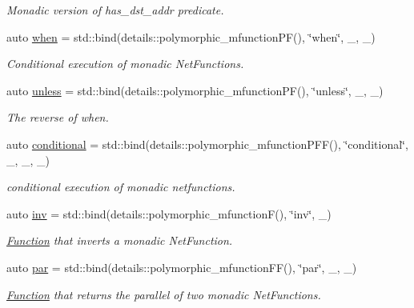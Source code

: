 \begin{DoxyCompactItemize}
\begin{DoxyCompactList}\small\item\em Monadic version of {\ttfamily has\+\_\+dst\+\_\+addr} predicate. \end{DoxyCompactList}\item 
auto \hyperlink{namespacepfq_1_1lang_1_1anonymous__namespace_02default_8hpp_03_a22ae8d6c01ae06cdfa698cf9198d292b}{when} = std\+::bind(details\+::polymorphic\+\_\+mfunction\+P\+F(), \char`\"{}when\char`\"{}, \+\_, \+\_)
\begin{DoxyCompactList}\small\item\em Conditional execution of monadic Net\+Functions. \end{DoxyCompactList}\item 
auto \hyperlink{namespacepfq_1_1lang_1_1anonymous__namespace_02default_8hpp_03_a4873d64e4d84c7c4c4cabe782de2b7b0}{unless} = std\+::bind(details\+::polymorphic\+\_\+mfunction\+P\+F(), \char`\"{}unless\char`\"{}, \+\_, \+\_)
\begin{DoxyCompactList}\small\item\em The reverse of {\ttfamily when}. \end{DoxyCompactList}\item 
auto \hyperlink{namespacepfq_1_1lang_1_1anonymous__namespace_02default_8hpp_03_a99247b15a4e37c0aaec60838716fc8dc}{conditional} = std\+::bind(details\+::polymorphic\+\_\+mfunction\+P\+F\+F(), \char`\"{}conditional\char`\"{}, \+\_, \+\_, \+\_)
\begin{DoxyCompactList}\small\item\em conditional execution of monadic netfunctions. \end{DoxyCompactList}\item 
auto \hyperlink{namespacepfq_1_1lang_1_1anonymous__namespace_02default_8hpp_03_a4e7c9b70d87164407c1dd1100ddd8363}{inv} = std\+::bind(details\+::polymorphic\+\_\+mfunction\+F(), \char`\"{}inv\char`\"{}, \+\_)
\begin{DoxyCompactList}\small\item\em \hyperlink{structpfq_1_1lang_1_1Function}{Function} that inverts a monadic Net\+Function. \end{DoxyCompactList}\item 
auto \hyperlink{namespacepfq_1_1lang_1_1anonymous__namespace_02default_8hpp_03_abd0f7876a26a959f9fc211cc23599493}{par} = std\+::bind(details\+::polymorphic\+\_\+mfunction\+F\+F(), \char`\"{}par\char`\"{}, \+\_, \+\_)
\begin{DoxyCompactList}\small\item\em \hyperlink{structpfq_1_1lang_1_1Function}{Function} that returns the parallel of two monadic Net\+Functions. \end{DoxyCompactList}\item 

\end{DoxyCompactItemize}
